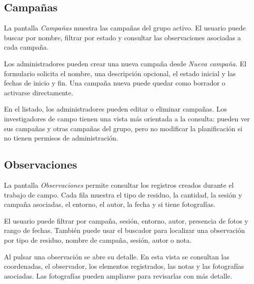 \subsection{Campañas}

La pantalla \textit{Campañas} muestra las campañas del grupo activo. El usuario puede
buscar por nombre, filtrar por estado y consultar las observaciones asociadas a cada
campaña.


Los administradores pueden crear una nueva campaña desde \textit{Nueva campaña}. El
formulario solicita el nombre, una descripción opcional, el estado inicial y las
fechas de inicio y fin. Una campaña nueva puede quedar como borrador o activarse
directamente.


En el listado, los administradores pueden editar o eliminar campañas. Los
investigadores de campo tienen una vista más orientada a la consulta: pueden ver sus
campañas y otras campañas del grupo, pero no modificar la planificación si no tienen
permisos de administración.

\subsection{Observaciones}

La pantalla \textit{Observaciones} permite consultar los registros creados durante el
trabajo de campo. Cada fila muestra el tipo de residuo, la cantidad, la sesión y
campaña asociadas, el entorno, el autor, la fecha y si tiene fotografías.


El usuario puede filtrar por campaña, sesión, entorno, autor, presencia de fotos y
rango de fechas. También puede usar el buscador para localizar una observación por
tipo de residuo, nombre de campaña, sesión, autor o nota.

Al pulsar una observación se abre su detalle. En esta vista se consultan las
coordenadas, el observador, los elementos registrados, las notas y las fotografías
asociadas. Las fotografías pueden ampliarse para revisarlas con más detalle.


